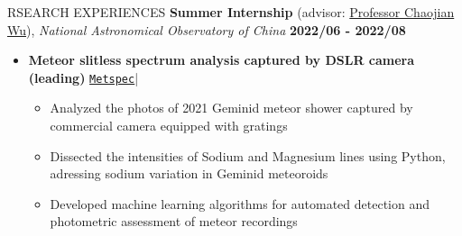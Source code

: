 \documentclass[10pt]{article} %
\begin{document}
\begin{section}{RSEARCH EXPERIENCES}
\textbf{Summer Internship} (advisor: \href{mailto:chjwu@bao.ac.cn}{Professor Chaojian Wu}), \textit{National Astronomical Observatory of China} \hfill \textbf{2022/06 - 2022/08} 
\begin{itemize}[leftmargin=1.5em]
    \item \textbf{Meteor slitless spectrum analysis captured by DSLR camera (leading)} 
    \hfill {\footnotesize \href{https://github.com/Chisen-Lupus/metspec}{\texttt{Metspec}}}| %
    \begin{itemize}[leftmargin=1.5em]
        \item Analyzed the photos of 2021 Geminid meteor shower captured by commercial camera equipped with gratings
        \item Dissected the intensities of Sodium and Magnesium lines using Python, adressing sodium variation in Geminid meteoroids
        \item Developed machine learning algorithms for automated detection and photometric assessment of meteor recordings
    \end{itemize}
\end{itemize}


\end{section}
\end{document}
